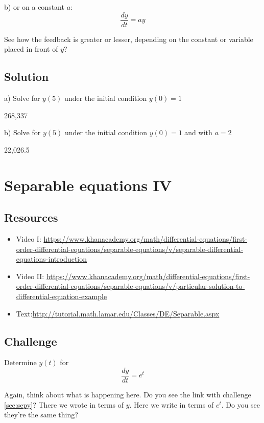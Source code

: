b) or on a constant $a$:
\begin{equation}
    \frac{dy}{dt} = ay
\end{equation}

See how the feedback is greater or lesser, depending on the constant or variable placed in front of $y$?

\subsection*{Solution}
a) Solve for $y(5)$ under the initial condition $y(0)=1$

268,337

b) Solve for $y(5)$ under the initial condition $y(0)=1$ and with $a=2$

22,026.5




\newpage
\section{Separable equations IV}

\subsection*{Resources}
\begin{itemize}
    \item Video I: \url{https://www.khanacademy.org/math/differential-equations/first-order-differential-equations/separable-equations/v/separable-differential-equations-introduction} 
    \item Video II: \url{https://www.khanacademy.org/math/differential-equations/first-order-differential-equations/separable-equations/v/particular-solution-to-differential-equation-example}
    \item Text:\url{http://tutorial.math.lamar.edu/Classes/DE/Separable.aspx}
\end{itemize}

\subsection*{Challenge}
Determine $y(t)$ for
\begin{equation}
    \frac{dy}{dt} = e^{t}
\end{equation}

Again, think about what is happening here. Do you see the link with challenge \ref{sec:sepy}? There we wrote in terms of $y$. Here we write in terms of $e^{t}$. Do you see they're the same thing?

